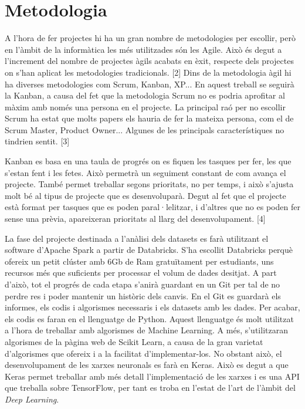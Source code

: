 \documentclass[10pt,a4paper,twocolumn,twoside]{article}
\begin{document}
\section {Metodologia}
A l'hora de fer projectes hi ha un gran nombre de metodologies per escollir, però en l'àmbit de la informàtica les més utilitzades són les Agile. Això és degut a l'increment del nombre de projectes àgils acabats en èxit, respecte dels projectes on s'han aplicat les metodologies tradicionals. [2] Dins de la metodologia àgil hi ha diverses metodologies com Scrum, Kanban, XP... En aquest treball se seguirà la Kanban, a causa del fet que la metodologia Scrum no es podria aprofitar al màxim amb només una persona en el projecte. La principal raó per no escollir Scrum ha estat que molts papers els hauria de fer la mateixa persona, com el de Scrum Master, Product Owner... Algunes de les principals característiques no tindrien sentit. [3]

Kanban es basa en una taula de progrés on es fiquen les tasques per fer, les que s'estan fent i les fetes. Això permetrà un seguiment constant de com avança el projecte. També permet treballar segons prioritats, no per temps, i això s'ajusta molt bé al tipus de projecte que es desenvoluparà. Degut al fet que el projecte està format per tasques que es poden paral·lelitzar, i d'altres que no es poden fer sense una prèvia, apareixeran prioritats al llarg del desenvolupament. [4]

La fase del projecte destinada a l'anàlisi dels datasets es farà utilitzant el software d'Apache Spark a partir de Databricks. S'ha escollit Databricks perquè ofereix un petit clúster amb 6Gb de Ram gratuïtament per estudiants, uns recursos més que suficients per processar el volum de dades desitjat.
A part d'això, tot el progrés de cada etapa s'anirà guardant en un Git per tal de no perdre res i poder mantenir un històric dels canvis. En el Git es guardarà els informes, els codis i algorismes necessaris i els datasets amb les dades.
Per acabar, els codis es faran en el llenguatge de Python. Aquest llenguatge és molt utilitzat a l'hora de treballar amb algorismes de Machine Learning. A més, s'utilitzaran algorismes de la pàgina web de Scikit Learn, a causa de la gran varietat d'algorismes que ofereix i a la facilitat d'implementar-los. No obstant això, el desenvolupament de les xarxes neuronals es farà en Keras. Això es degut a que Keras permet treballar amb més detall l'implementació de les xarxes i es una API que treballa sobre TensorFlow, per tant es troba en l'estat de l'art de l'àmbit del \textit{Deep Learning}.
\end{document}
